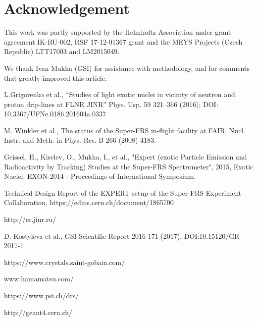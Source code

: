 \documentclass{webofc}
\newcommand{\er}{\textmd{EXPERTroot}}
\begin{document}
	
\section{Acknowledgement}

This  work was partly supported by the Helmholtz Association under grant agreement IK-RU-002, RSF 17-12-01367 grant and the MEYS Projects (Czech Republic) LTT17003 and LM2015049.

We thank Ivan Mukha (GSI) for assistance with methodology, and for comments that greatly improved this article.


	
\begin{thebibliography}{99}
	L.Grigorenko et al., “Studies of light exotic nuclei in vicinity of neutron and proton drip-lines at FLNR JINR” Phys. Usp. 59 321–366 (2016); DOI: 10.3367/UFNe.0186.201604a.0337
		
	M. Winkler et al., The status of the Super-FRS in-flight facility at FAIR, Nucl. Instr. and Meth. in Phys. Res. B 266 (2008) 4183.
	
	Geissel, H., Kiselev, O., Mukha, I., et al., "Expert (exotic Particle Emission and Radioactivity by Tracking) Studies at the Super-FRS Spectrometer", 2015, Exotic Nuclei: EXON-2014 - Proceedings of International Symposium.
	
	Technical Design Report of the EXPERT setup of the Super-FRS Experiment Collaboration, https;//edms.cern.ch/document/1865700

	http://er.jinr.ru/

	D. Kostyleva et al., GSI Scientific Report 2016 171 (2017), DOI:10.15120/GR-2017-1
	
	https://www.crystals.saint-gobain.com/
	
	www.hamamatsu.com/
	
	https://www.psi.ch/drs/
	
	http://geant4.cern.ch/
	
	
\end{thebibliography}
\end{document}
